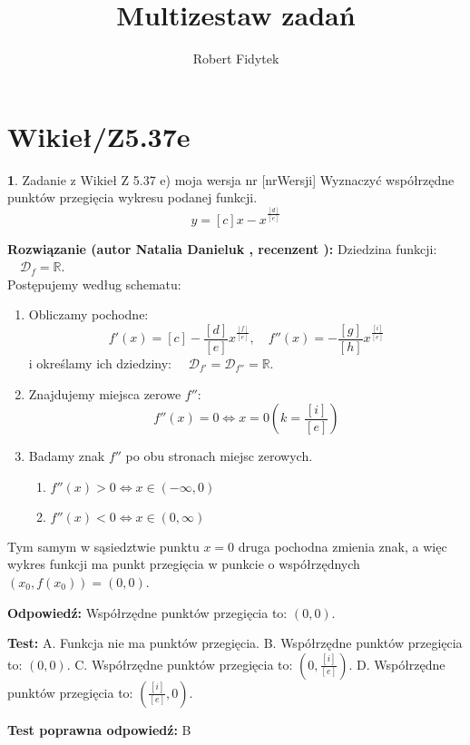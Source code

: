 \documentclass[12pt, a4paper]{article}
\title{Multizestaw zadań}
\author{Robert Fidytek}
\date{}
\theoremstyle{definition} %
\newtheorem{zad}{}
\newcommand{\kategoria}[1]{\section{#1}} %
\newcommand{\zadStart}[1]{\begin{zad}#1\newline} %
\newcommand{\zadStop}{\end{zad}}   %
\newcommand{\rozwStart}[2]{\noindent \textbf{Rozwiązanie (autor #1 , recenzent #2): }\newline} %
\newcommand{\rozwStop}{\newline}                                            %
\newcommand{\odpStart}{\noindent \textbf{Odpowiedź:}\newline}    %
\newcommand{\odpStop}{\newline}                                             %
\newcommand{\testStart}{\noindent \textbf{Test:}\newline} %
\newcommand{\testStop}{\newline} %
\newcommand{\kluczStart}{\noindent \textbf{Test poprawna odpowiedź:}\newline} %
\newcommand{\kluczStop}{\newline} %
\begin{document}
\maketitle

\kategoria{Wikieł/Z5.37e}

\zadStart{Zadanie z Wikieł Z 5.37 e) moja wersja nr [nrWersji]}
Wyznaczyć współrzędne punktów przegięcia wykresu podanej funkcji.
$$y = [c]x - x^{\frac{[d]}{[e]}}$$
\zadStop

\rozwStart{Natalia Danieluk}{}
Dziedzina funkcji: $\quad \mathcal{D}_f=\mathbb{R}$. \\
Postępujemy według schematu:
\begin{enumerate}
\item Obliczamy pochodne: 
$$f'(x) = [c] - \frac{[d]}{[e]}x^{\frac{[f]}{[e]}},\quad f''(x) = - \frac{[g]}{[h]}x^{\frac{[i]}{[e]}}$$
i określamy ich dziedziny: $\quad \mathcal{D}_{f'}=\mathcal{D}_{f''}=\mathbb{R}$. \\
\item Znajdujemy miejsca zerowe $f''$: 
$$f''(x)=0 \Leftrightarrow x=0 (k=\frac{[i]}{[e]})$$
\item Badamy znak $f''$ po obu stronach miejsc zerowych. \\
	\begin{enumerate}
	\item $f''(x) > 0 \Leftrightarrow x \in (-\infty,0)$\\
	\item $f''(x) < 0 \Leftrightarrow x \in (0,\infty)$
	\end{enumerate}
\end{enumerate}
Tym samym w sąsiedztwie punktu $x=0$ druga pochodna zmienia znak, a więc wykres funkcji ma punkt przegięcia w punkcie o współrzędnych $(x_0,f(x_0)) = (0,0)$.
\rozwStop

\odpStart
Współrzędne punktów przegięcia to: $(0,0)$.
\odpStop

\testStart
A. Funkcja nie ma punktów przegięcia.
B. Współrzędne punktów przegięcia to: $(0,0)$.
C. Współrzędne punktów przegięcia to: $(0,\frac{[i]}{[e]})$.
D. Współrzędne punktów przegięcia to: $(\frac{[i]}{[e]},0)$.
\testStop

\kluczStart
B
\kluczStop
\end{document}
